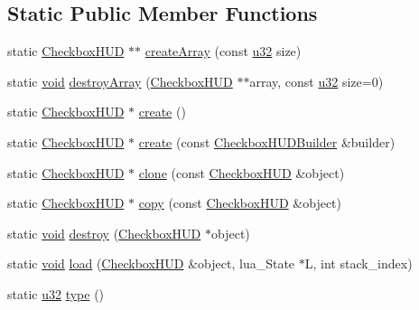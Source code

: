\subsection*{Static Public Member Functions}
\begin{DoxyCompactItemize}
\item 
static \mbox{\hyperlink{classnjli_1_1_checkbox_h_u_d}{Checkbox\+H\+UD}} $\ast$$\ast$ \mbox{\hyperlink{classnjli_1_1_checkbox_h_u_d_aa55de648a51d6a4b9deaeb7d1f0aecf1}{create\+Array}} (const \mbox{\hyperlink{_util_8h_a10e94b422ef0c20dcdec20d31a1f5049}{u32}} size)
\item 
static \mbox{\hyperlink{_thread_8h_af1e856da2e658414cb2456cb6f7ebc66}{void}} \mbox{\hyperlink{classnjli_1_1_checkbox_h_u_d_a78fec39b7c044f3b42cb16edd1a20f85}{destroy\+Array}} (\mbox{\hyperlink{classnjli_1_1_checkbox_h_u_d}{Checkbox\+H\+UD}} $\ast$$\ast$array, const \mbox{\hyperlink{_util_8h_a10e94b422ef0c20dcdec20d31a1f5049}{u32}} size=0)
\item 
static \mbox{\hyperlink{classnjli_1_1_checkbox_h_u_d}{Checkbox\+H\+UD}} $\ast$ \mbox{\hyperlink{classnjli_1_1_checkbox_h_u_d_ad82c2050436a46588852bfdce166dd14}{create}} ()
\item 
static \mbox{\hyperlink{classnjli_1_1_checkbox_h_u_d}{Checkbox\+H\+UD}} $\ast$ \mbox{\hyperlink{classnjli_1_1_checkbox_h_u_d_ac1d8b71694df11c9ea0192021d8e0d1d}{create}} (const \mbox{\hyperlink{classnjli_1_1_checkbox_h_u_d_builder}{Checkbox\+H\+U\+D\+Builder}} \&builder)
\item 
static \mbox{\hyperlink{classnjli_1_1_checkbox_h_u_d}{Checkbox\+H\+UD}} $\ast$ \mbox{\hyperlink{classnjli_1_1_checkbox_h_u_d_aa7dd57a54aa295cabb00bfa5440024b8}{clone}} (const \mbox{\hyperlink{classnjli_1_1_checkbox_h_u_d}{Checkbox\+H\+UD}} \&object)
\item 
static \mbox{\hyperlink{classnjli_1_1_checkbox_h_u_d}{Checkbox\+H\+UD}} $\ast$ \mbox{\hyperlink{classnjli_1_1_checkbox_h_u_d_a4e36b531b587aa5b8b6c0f4784cf6da5}{copy}} (const \mbox{\hyperlink{classnjli_1_1_checkbox_h_u_d}{Checkbox\+H\+UD}} \&object)
\item 
static \mbox{\hyperlink{_thread_8h_af1e856da2e658414cb2456cb6f7ebc66}{void}} \mbox{\hyperlink{classnjli_1_1_checkbox_h_u_d_aa0a2b943e1310f959840e941ff625ba5}{destroy}} (\mbox{\hyperlink{classnjli_1_1_checkbox_h_u_d}{Checkbox\+H\+UD}} $\ast$object)
\item 
static \mbox{\hyperlink{_thread_8h_af1e856da2e658414cb2456cb6f7ebc66}{void}} \mbox{\hyperlink{classnjli_1_1_checkbox_h_u_d_a4ce3230f14d2c7078ea27a4ab3248c3e}{load}} (\mbox{\hyperlink{classnjli_1_1_checkbox_h_u_d}{Checkbox\+H\+UD}} \&object, lua\+\_\+\+State $\ast$L, int stack\+\_\+index)
\item 
static \mbox{\hyperlink{_util_8h_a10e94b422ef0c20dcdec20d31a1f5049}{u32}} \mbox{\hyperlink{classnjli_1_1_checkbox_h_u_d_a92edaeae8e24b4f07814e20d4fbff290}{type}} ()
\end{DoxyCompactItemize}
